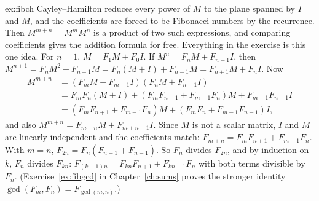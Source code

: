 \begin{solution}{ex:fibch}
\idea Cayley--Hamilton reduces every power of $M$ to the plane spanned by $I$ and $M$, and the coefficients are forced to be Fibonacci numbers by the recurrence. Then $M^{m+n}=M^mM^n$ is a product of two such expressions, and comparing coefficients gives the addition formula for free. Everything in the exercise is this one idea.
\writeup For $n=1$, $M=F_1M+F_0I$. If $M^n=F_nM+F_{n-1}I$, then $M^{n+1}=F_nM^2+F_{n-1}M=F_n(M+I)+F_{n-1}M=F_{n+1}M+F_nI$. Now
\[
\begin{aligned}
M^{m+n}&=(F_mM+F_{m-1}I)(F_nM+F_{n-1}I)\\
&=F_mF_n(M+I)+(F_mF_{n-1}+F_{m-1}F_n)M+F_{m-1}F_{n-1}I\\
&=(F_mF_{n+1}+F_{m-1}F_n)M+(F_mF_n+F_{m-1}F_{n-1})I ,
\end{aligned}
\]
and also $M^{m+n}=F_{m+n}M+F_{m+n-1}I$. Since $M$ is not a scalar matrix, $I$ and $M$ are linearly independent and the coefficients match: $F_{m+n}=F_mF_{n+1}+F_{m-1}F_n$. With $m=n$, $F_{2n}=F_n(F_{n+1}+F_{n-1})$. So $F_n$ divides $F_{2n}$, and by induction on $k$, $F_n$ divides $F_{kn}$: $F_{(k+1)n}=F_{kn}F_{n+1}+F_{kn-1}F_n$ with both terms divisible by $F_n$. (Exercise~\ref{ex:fibgcd} in Chapter~\ref{ch:sums} proves the stronger identity $\gcd(F_m,F_n)=F_{\gcd(m,n)}$.)
\end{solution}

